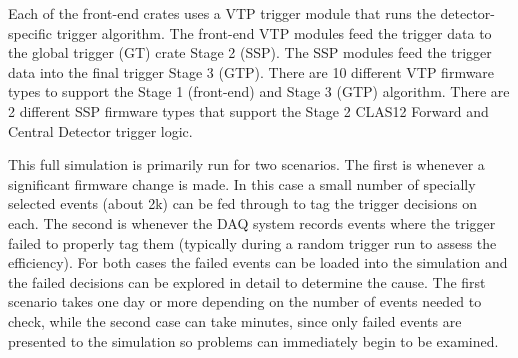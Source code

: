 Each of the front-end crates uses a VTP trigger module that runs the detector-specific trigger algorithm. The front-end VTP modules feed the trigger data to the global trigger (GT) crate Stage 2 (SSP). The SSP modules feed the trigger data into the final trigger Stage 3 (GTP). There are 10 different VTP firmware types to support the Stage 1 (front-end) and Stage 3 (GTP) algorithm. There are 2 different SSP firmware types that support the Stage 2 CLAS12 Forward and Central Detector trigger logic.

This full simulation is primarily run for two scenarios. The first is whenever a significant firmware change is made. In this case a small number of specially selected events (about 2k) can be fed through to tag the trigger decisions on each. The second is whenever the DAQ system records events where the trigger failed to properly tag them (typically during a random trigger run to assess the efficiency). For both cases the failed events can be loaded into the simulation and the failed decisions can be explored in detail to determine the cause. The first scenario takes one day or more depending on the number of events needed to check, while the second case can take minutes, since only failed events are presented to the simulation so problems can immediately begin to be examined.